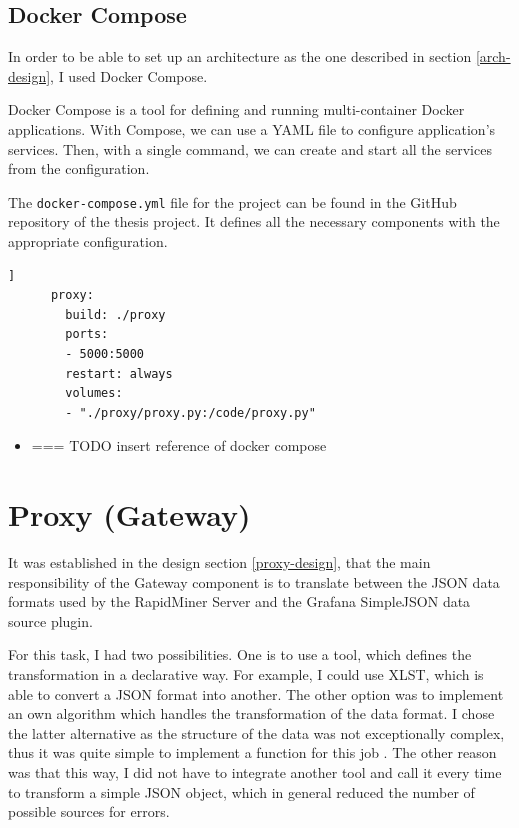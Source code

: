 \subsection{Docker Compose}

In order to be able to set up an architecture as the one described in section \ref{arch-design}, I used Docker Compose.


Docker Compose is a tool for defining and running multi-container Docker applications. With Compose, we can use a YAML file to configure application’s services. Then, with a single command, we can create and start all the services from the configuration.

The \texttt{docker-compose.yml} file for the project can be found in the GitHub repository of the thesis project. It defines all the necessary components with the appropriate configuration.

\begin{minipage}{\linewidth}
	\begin{lstlisting}[language=docker-compose-proxy, caption={Extract of the \texttt{docker-compose.yml}}, label={lst:proxy-docker-compose}]]	
	  proxy:
	    build: ./proxy
	    ports:
	    - 5000:5000
	    restart: always
	    volumes: 
	    - "./proxy/proxy.py:/code/proxy.py"
	\end{lstlisting}
\end{minipage}

\begin{center}
	\begin{itemize}
		\item === TODO insert reference of docker compose
	\end{itemize}
\end{center}

\section{Proxy (Gateway)} \label{proxy-impl}

It was established in the design section \ref{proxy-design}, that the main responsibility of the Gateway component is to translate between the JSON data formats used by the RapidMiner Server and the Grafana SimpleJSON data source plugin.

For this task, I had two possibilities. One is to use a tool, which defines the transformation in a declarative way. For example, I could use XLST, which is able to convert a JSON format into another. The other option was to implement an own algorithm which handles the transformation of the data format. I chose the latter alternative as the structure of the data was not exceptionally complex, thus it was quite simple to implement a function for this job . The other reason was that this way, I did not have to integrate another tool and call it every time to transform a simple JSON object, which in general reduced the number of possible sources for errors.


